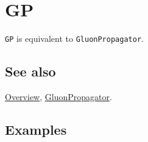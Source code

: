 \documentclass[../FeynCalcManual.tex]{subfiles}
\begin{document}
\hypertarget{gp}{%
\section{GP}\label{gp}}

\texttt{GP} is equivalent to \texttt{GluonPropagator}.

\subsection{See also}

\hyperlink{toc}{Overview}, \hyperlink{gluonpropagator}{GluonPropagator}.

\subsection{Examples}
\end{document}
